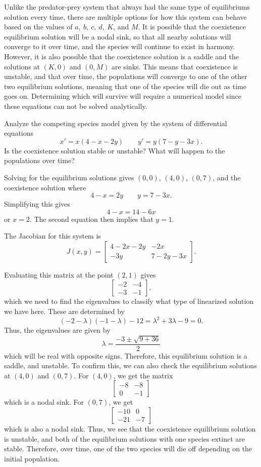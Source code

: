 Unlike the predator-prey system that always had the same type of equilibriums solution every time, there are multiple options for how this system can behave based on the values of $a,\ b,\ c,\ d,\ K$, and $M$. It is possible that the coexistence equilibrium solution will be a nodal sink, so that all nearby solutions will converge to it over time, and the species will continue to exist in harmony. However, it is also possible that the coexistence solution is a saddle and the solutions at $(K,0)$ and $(0,M)$ are sinks. This means that coexistence is unstable, and that over time, the populations will converge to one of the other two equilibrium solutions, meaning that one of the species will die out as time goes on. Determining which will survive will require a numerical model since these equations can not be solved analytically. 

\begin{example}
Analyze the competing species model given by the system of differential equations
\[ x' = x(4-x-2y) \qquad y' = y(7 - y - 3x). \] Is the coexistence solution stable or unstable? What will happen to the populations over time?
\end{example}

\begin{exampleSol}
Solving for the equilibrium solutions gives $(0,0)$, $(4, 0)$, $(0, 7)$, and the coexistence solution where
\[ 4 - x = 2y \qquad y = 7-3x. \] Simplifying this gives
\[ 4 - x = 14 - 6x \] or $x=2$. The second equation then implies that $y=1$. 

The Jacobian for this system is 
\[ J(x,y) = \begin{bmatrix} 4 - 2x - 2y & -2x \\ -3y & 7 - 2y - 3x \end{bmatrix}. \]

Evaluating this matrix at the point $(2,1)$ gives
\[ \begin{bmatrix} -2 & -4 \\ -3 & -1 \end{bmatrix}, \] which we need to find the eigenvalues to classify what type of linearized solution we have here. These are determined by
\[ (-2-\lambda)(-1-\lambda) - 12 = \lambda^2 + 3\lambda - 9 = 0.\] Thus, the eigenvalues are given by
\[ \lambda = \frac{-3 \pm \sqrt{9 + 36}}{2} \] which will be real with opposite signs. Therefore, this equilibrium solution is a saddle, and unstable. To confirm this, we can also check the equilibrium solutions at $(4,0)$ and $(0,7)$. For $(4,0)$, we get the matrix
\[ \begin{bmatrix} -8 & -8 \\ 0 & -1 \end{bmatrix} \] which is a nodal sink. For $(0,7)$, we get
\[ \begin{bmatrix} -10 & 0 \\ -21 & -7 \end{bmatrix} \] which is also a nodal sink. Thus, we see that the coexistence equilibrium solution is unstable, and both of the equilibrium solutions with one species extinct are stable. Therefore, over time, one of the two species will die off depending on the initial population.
\end{exampleSol} 


